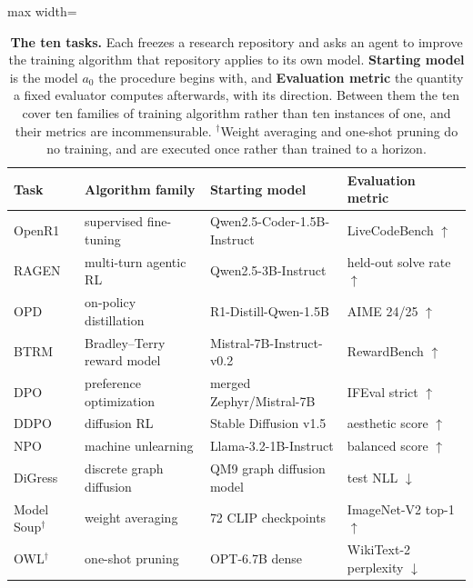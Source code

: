\begin{table}[t]
\centering
\caption{\textbf{The ten \ai{} tasks.} Each freezes a research repository and asks an agent to
improve the training algorithm that repository applies to its own model. \textbf{Starting model} is
the model $a_0$ the procedure begins with, and \textbf{Evaluation metric} the quantity a fixed
evaluator computes afterwards, with its direction. Between them the ten cover ten families of
training algorithm rather than ten instances of one, and their metrics are incommensurable.
$^{\dagger}$Weight averaging and one-shot pruning
do no training, and are executed once rather than trained to a horizon.}
\label{tab:tasks}
\small
\begin{adjustbox}{max width=\linewidth}
\begin{tabular}{llll}
\toprule
\textbf{Task} & \textbf{Algorithm family} & \textbf{Starting model} & \textbf{Evaluation metric} \\
\midrule
OpenR1     & supervised fine-tuning        & Qwen2.5-Coder-1.5B-Instruct   & LiveCodeBench $\uparrow$ \\
RAGEN      & multi-turn agentic RL         & Qwen2.5-3B-Instruct           & held-out solve rate $\uparrow$ \\
OPD        & on-policy distillation        & R1-Distill-Qwen-1.5B          & AIME 24/25 $\uparrow$ \\
BTRM       & Bradley--Terry reward model   & Mistral-7B-Instruct-v0.2      & RewardBench $\uparrow$ \\
DPO        & preference optimization       & merged Zephyr/Mistral-7B      & IFEval strict $\uparrow$ \\
DDPO       & diffusion RL                  & Stable Diffusion v1.5         & aesthetic score $\uparrow$ \\
NPO        & machine unlearning            & Llama-3.2-1B-Instruct         & balanced score $\uparrow$ \\
DiGress    & discrete graph diffusion      & QM9 graph diffusion model     & test NLL $\downarrow$ \\
\midrule
Model Soup$^{\dagger}$ & weight averaging  & 72 CLIP checkpoints           & ImageNet-V2 top-1 $\uparrow$ \\
OWL$^{\dagger}$        & one-shot pruning  & OPT-6.7B dense                & WikiText-2 perplexity $\downarrow$ \\
\bottomrule
\end{tabular}
\end{adjustbox}
\end{table}
